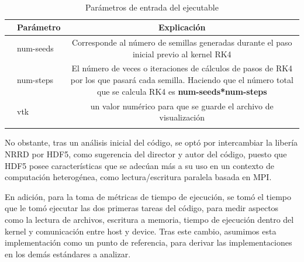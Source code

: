 \begin{table}[H]
	\centering
	\vspace{-4mm}
	\caption{\\Parámetros de entrada del ejecutable} \label{tab:parametros}
	\begin{tabular}{lm{4.7cm}m{0.60\linewidth}c}
		\hline
		\multicolumn{1}{l}{}                   &
		\multicolumn{1}{c}{\textbf{Parámetro}} &
		\multicolumn{1}{c}{\textbf{Explicación}}                                                                                                                                      \\ \hline
		                                       & \centering num-seeds  &
		Corresponde al número de semillas generadas durante el paso inicial previo al kernel RK4                                                                                      \\
		                                       & \centering  num-steps &
		El número de veces o iteraciones de cálculos de pasos de RK4 por los que pasará cada semilla. Haciendo que el número total que se calcula RK4 es \textbf{num-seeds*num-steps} \\
		                                       & \centering vtk        &
		un valor numérico para que se guarde el archivo de visualización                                                                                                              \\
		\\ \hline
	\end{tabular}
	\vspace{-4mm}
\end{table}

No obstante, tras un análisis inicial del código, se optó por intercambiar la libería NRRD por HDF5, como sugerencia del director y autor del código, puesto que HDF5 posee características que se adecúan más a su uso en un contexto de computación heterogénea, como lectura/escritura paralela basada en MPI.

En adición, para la toma de métricas de tiempo de ejecución, se tomó el tiempo que le tomó ejecutar las dos primeras tareas del código, para medir aspectos como la lectura de archivos, escritura a memoria, tiempo de ejecución dentro del kernel y comunicación entre host y device. Tras este cambio, asumimos esta implementación como un punto de referencia, para derivar las implementaciones en los demás estándares a analizar.

